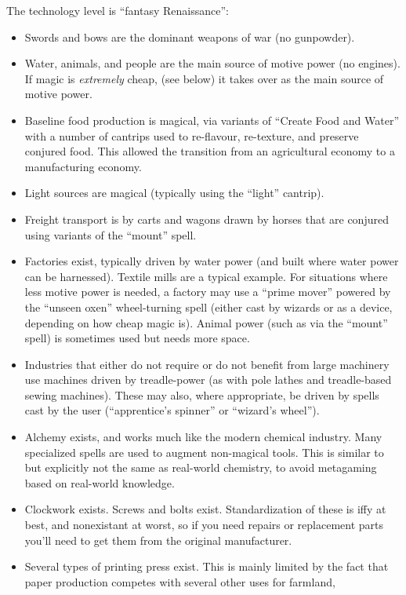 
The technology level is ``fantasy Renaissance'':
\begin{itemize}
%
\item Swords and bows are the dominant weapons of war (no gunpowder).
%
\item Water, animals, and people are the main source of motive power (no
engines). If magic is \textit{extremely} cheap, (see below) it takes over
as the main source of motive power.
%
\item Baseline food production is magical, via variants of ``Create Food
and Water'' with a number of cantrips used to re-flavour, re-texture, and
preserve conjured food. This allowed the transition from an agricultural
economy to a manufacturing economy.
%
\item Light sources are magical (typically using the ``light'' cantrip).
%
\item Freight transport is by carts and wagons drawn by horses that are
conjured using variants of the ``mount'' spell.
%
\item Factories exist, typically driven by water power (and built where
water power can be harnessed). Textile mills are a typical example. For
situations where less motive power is needed, a factory may use a ``prime
mover'' powered by the ``unseen oxen'' wheel-turning spell (either cast by
wizards or as a device, depending on how cheap magic is). Animal power
(such as via the ``mount'' spell) is sometimes used but needs more space.
%
\item Industries that either do not require or do not benefit from large
machinery use machines driven by treadle-power (as with pole lathes and
treadle-based sewing machines). These may also, where appropriate, be
driven by spells cast by the user (``apprentice's spinner'' or ``wizard's
wheel'').
%
\item Alchemy exists, and works much like the modern chemical industry.
Many specialized spells are used to augment non-magical tools. This is
similar to but explicitly not the same as real-world chemistry, to avoid
metagaming based on real-world knowledge.
%
\item Clockwork exists. Screws and bolts exist. Standardization of these
is iffy at best, and nonexistant at worst, so if you need repairs or
replacement parts you'll need to get them from the original manufacturer.
%
\item Several types of printing press exist. This is mainly limited by the
fact that paper production competes with several other uses for farmland,

\end{itemize}
